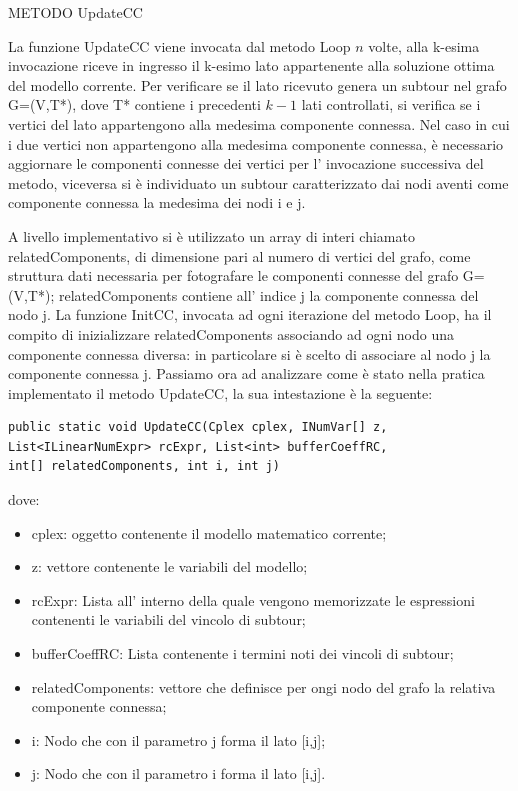 \documentclass[11pt]{article}
\begin{document}
\vspace{2\baselineskip}
METODO UpdateCC
\vspace{2\baselineskip}


La funzione UpdateCC viene invocata dal metodo Loop $n$ volte, alla k-esima invocazione riceve in ingresso il k-esimo lato appartenente alla soluzione ottima del modello corrente. Per verificare se il lato ricevuto genera un subtour nel grafo G=(V,T*), dove T* contiene i precedenti $k-1$ lati controllati, si verifica se i vertici del lato appartengono alla medesima componente connessa. Nel caso in cui i due vertici non appartengono alla medesima componente connessa, \`e necessario aggiornare le componenti connesse dei vertici per l' invocazione successiva del metodo, viceversa si \`e  individuato un subtour caratterizzato dai nodi aventi come componente connessa la medesima dei nodi i e j.

A livello implementativo si \`e utilizzato un array di interi chiamato relatedComponents, di dimensione pari al numero di vertici del grafo, come struttura dati necessaria per fotografare le componenti connesse del grafo G=(V,T*); relatedComponents contiene all' indice j la componente connessa del nodo j. La funzione InitCC, invocata ad ogni iterazione del metodo Loop, ha il compito di inizializzare relatedComponents associando ad ogni nodo una componente connessa diversa: in particolare si \`e  scelto di associare al nodo j la componente connessa j. Passiamo ora ad analizzare come \`e  stato nella pratica implementato il metodo UpdateCC, la sua intestazione \`e la seguente:

\begin{lstlisting}
public static void UpdateCC(Cplex cplex, INumVar[] z, List<ILinearNumExpr> rcExpr, List<int> bufferCoeffRC,                int[] relatedComponents, int i, int j)

\end{lstlisting}

dove:
\begin{itemize}
\item cplex: oggetto contenente il modello matematico corrente;
\item z: vettore contenente le variabili del modello;
\item rcExpr: Lista all' interno della quale vengono memorizzate le espressioni contenenti le variabili del vincolo di subtour;
\item bufferCoeffRC: Lista contenente i termini noti dei vincoli di subtour;
\item relatedComponents: vettore che definisce per ongi nodo del grafo la relativa componente connessa;
\item i: Nodo che con il parametro j forma il lato [i,j];
\item j: Nodo che con il parametro i forma il lato [i,j].
\end{itemize}
\end{document}

